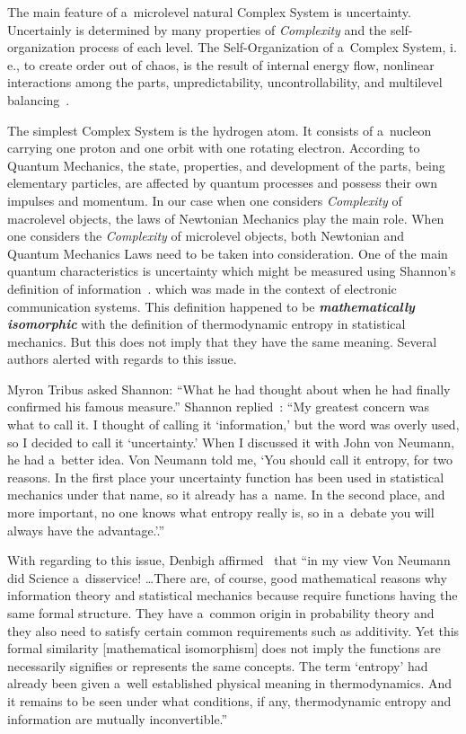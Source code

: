 \begin{multicols}{2}
The main feature of a~microlevel natural 
Complex System is uncertainty. Uncertainly is determined by many properties of 
\textit{Complexity} and the self-organization process of each level. The Self-Organization of 
a~Complex System, i.\,e., to create order out of chaos, is the result of internal energy flow, nonlinear 
interactions among the parts, unpredictability, uncontrollability, and multilevel balancing~\cite{7-sel}. 

The simplest Complex System is the hydrogen atom. It consists of a~nucleon carrying
 one proton and one orbit with one rotating electron. According to Quantum Mechanics, the state, 
properties, and development of the parts, being elementary particles, are affected by quantum 
processes and possess their own impulses and momentum. In our case when one considers 
\textit{Complexity} of macrolevel objects, the laws of Newtonian Mechanics play the main 
role. When one considers the \textit{Complexity} of microlevel objects, both Newtonian and 
Quantum Mechanics Laws need to be taken into consideration. One of the main quantum 
characteristics is uncertainty which might be measured using Shannon's definition of 
information~\cite{8-sel, 9-sel}. which was made in the context of electronic communication systems. This 
definition happened to be {\bfseries\textit{mathematically isomorphic}} with the definition of 
thermodynamic entropy in statistical mechanics. But this does not imply that they have the 
same meaning. Several authors alerted with regards to this issue. 

Myron Tribus asked Shannon: ``What he had thought about when he had finally confirmed his 
famous measure.'' Shannon replied~\cite{10-sel}: 
``My greatest concern was what to call it. I thought of calling it `information,' but the word 
was overly used, so I decided to call it `uncertainty.' When I discussed it with John von 
Neumann, he had a~better idea. Von Neumann told me, `You should call it entropy, for two 
reasons. In the first place your uncertainty function has been used in statistical mechanics 
under that name, so it already has a~name. In the second place, and more important, no one 
knows what entropy really is, so in a~debate you will always have the advantage.'.''

\columnbreak

With regarding to this issue, Denbigh affirmed~\cite{11-sel} that 
``in my view Von Neumann did Science a~disservice! \ldots There are, of course, good 
mathematical reasons why information theory and statistical mechanics because require 
functions having the same formal structure. They have a~common origin in probability 
theory and they also need to satisfy certain common requirements such as additivity. Yet 
this formal similarity [mathematical isomorphism] does not imply the functions are 
necessarily signifies or represents the same concepts. The term `entropy' had already been 
given a~well established physical meaning in thermodynamics. And it remains to be seen 
under what conditions, if any, thermodynamic entropy and information are mutually 
inconvertible.''


\end{multicols}
